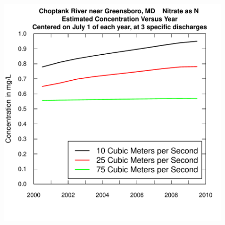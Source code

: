 \documentclass[a4paper,11pt]{article}
\begin{document}
\begin{figure}[htbp]
  \begin{minipage}[h]{0.5\linewidth}
    \begin{center}

\includegraphics{EGRET-figplotConcTimeSmooth}
    \label{fig:plotConcTimeSmooth}
    \end{center}
  \end{minipage}
  \caption{}
  \label{fig:plotConcTimeSmoothAND}
\end{figure}












\end{document}
